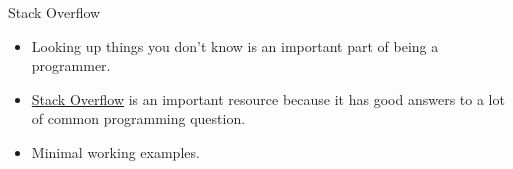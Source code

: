 \begin{frame}{Stack Overflow}

 \begin{itemize}

  \item Looking up things you don't know is an important part of being a 
   programmer.

  \item \href{http://stackoverflow.com/}{Stack Overflow} is an important 
   resource because it has good answers to a lot of common programming 
   question.

  \item Minimal working examples.

 \end{itemize}

\end{frame}

